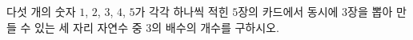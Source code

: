\hspace*{2mm}\begin{minipage}[t]{\dimexpr\linewidth-2mm\relax}\vspace{0pt}
다섯 개의 숫자 $1$, $2$, $3$, $4$, $5$가 각각 하나씩 적힌 $5$장의 카드에서 동시에 $3$장을 뽑아 만들 수 있는 세 자리 자연수 중 $3$의 배수의 개수를 구하시오.\end{minipage}

